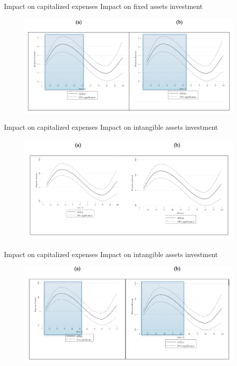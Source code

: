 \documentclass[10pt,handout,xcolor=pdftex,dvipsnames,table]{beamer}
\begin{document}
\begin{frame}{Impact on capitalized expenses}
Impact on fixed assets investment
\begin{figure}[t]
\centering
\includegraphics[width=1\textwidth]{./Figs/FAshad.png}
\end{figure}
\end{frame}
\begin{frame}{Impact on capitalized expenses}
Impact on intangible assets investment
\begin{figure}[t]
\centering
\includegraphics[width=1\textwidth]{./Figs/IA.png}
\end{figure}
\end{frame}
\begin{frame}{Impact on capitalized expenses}
Impact on intangible assets investment
\begin{figure}[t]
\centering
\includegraphics[width=1.0\textwidth]{./Figs/IAshad.png}
\end{figure}
\end{frame}
\end{document}
